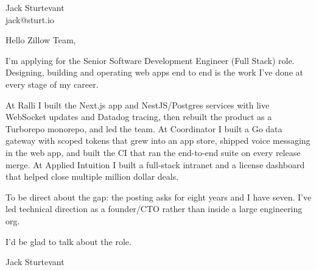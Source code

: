 \documentclass[11pt]{article}
\begin{document}
\raggedright

{\namefont\fontsize{20pt}{24pt}\selectfont Jack Sturtevant}\\[-0.3em]
jack@sturt.io

\vspace{1.2em}

Hello Zillow Team,

I'm applying for the Senior Software Development Engineer (Full Stack) role. Designing, building and operating web apps end to end is the work I've done at every stage of my career.

At Ralli I built the Next.js app and NestJS/Postgres services with live WebSocket updates and Datadog tracing, then rebuilt the product as a Turborepo monorepo, and led the team. At Coordinator I built a Go data gateway with scoped tokens that grew into an app store, shipped voice messaging in the web app, and built the CI that ran the end-to-end suite on every release merge. At Applied Intuition I built a full-stack intranet and a license dashboard that helped close multiple million dollar deals.

To be direct about the gap: the posting asks for eight years and I have seven. I've led technical direction as a founder/CTO rather than inside a large engineering org.

I'd be glad to talk about the role.

\vspace{0.6em}
Jack Sturtevant
\end{document}
